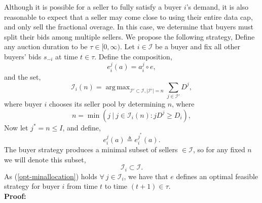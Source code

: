 \documentclass[12pt]{article}
\theoremstyle{definition}
\newcommand{\vs}{\varsigma}
\newcommand{\mcI}{\mathcal{I}}
\DeclareMathOperator*{\argmax}{arg\,max}
\DeclareMathOperator*{\argmin}{arg\,min}
\begin{document}
\begin{multicols}{2}
Although it is possible for a seller to fully satisfy a buyer $i$'s demand, it
is also reasonable to expect that a seller may come close to using their
entire data cap, and only sell the fractional overage. In this case, we
determine that buyers must split their bids among multiple sellers. 
We propose the following strategy, 
{
\label{buyerstrategy}
Define any auction duration to be $\tau \in [0,\infty)$. 
Let $i\in\mcI$ be a buyer and fix all other buyers' bids $s_{-i}$ at time
$t\in\tau$. %
Define the composition,
$$
    e_i^j(a) = a_i^j \circ e,
$$
and the set,
$$
    \mcI_i(n) =\argmax_{\mcI' \subset \mcI, \vert\mcI'\vert =
n}\sum_{j\in\mcI'} D^j,
$$
where buyer $i$ chooses its seller pool by determining $n$, where
\begin{equation}\label{buyercoordinate}
    n = \min( j\ \vert\ j\in \mcI_i(n): j D^j\ge D_i),
\end{equation} 
Now let $j^* = n \le I$, and define,
\begin{equation}\label{opt-minallocation}
    e_i^j(a) \triangleq e_i^{j^*}(a).
\end{equation}
The buyer strategy produces a minimal subset of sellers $\in \mcI$, so for any
fixed $n$ we will denote this subset,
\begin{equation}\label{sellers}
    \mcI_i \subset \mcI.
\end{equation}  
As (\ref{opt-minallocation}) holds $\forall \ j\in\mcI_i$,
we have that $e$ defines an optimal feasible strategy for buyer $i$ from time $t$ to time $(t+1) \in\tau$.
}\\
\textbf{Proof:}


\end{multicols}
\end{document}

